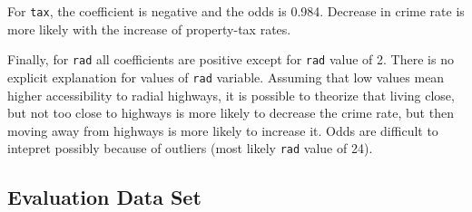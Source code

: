 \documentclass[]{article}
\begin{document}
For \texttt{tax}, the coefficient is negative and the odds is 0.984.
Decrease in crime rate is more likely with the increase of property-tax
rates.

Finally, for \texttt{rad} all coefficients are positive except for
\texttt{rad} value of 2. There is no explicit explanation for values of
\texttt{rad} variable. Assuming that low values mean higher
accessibility to radial highways, it is possible to theorize that living
close, but not too close to highways is more likely to decrease the
crime rate, but then moving away from highways is more likely to
increase it. Odds are difficult to intepret possibly because of outliers
(most likely \texttt{rad} value of 24).

\hypertarget{evaluation-data-set}{%
\subsection{Evaluation Data Set}\label{evaluation-data-set}}
\end{document}
